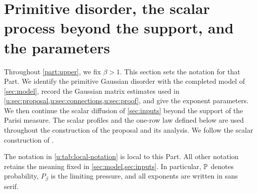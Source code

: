 \chapter{Primitive disorder, the scalar process beyond the support, and the parameters}\label{u:sec:setup}

Throughout \cref{part:upper}, we fix $\beta>1$. This section sets
the notation for that Part. We identify the
primitive Gaussian disorder with the completed model of \cref{sec:model},
record the Gaussian matrix estimates used in
\cref{u:sec:proposal,u:sec:connections,u:sec:proof}, and give the exponent
parameters. We then continue the scalar diffusion of \cref{sec:inputs}
beyond the support of the Parisi measure. The scalar profiles and the
one-row law defined below are used throughout the construction of the
proposal and its analysis. We follow the scalar construction of
\cite[Sections~2--3]{oai-typical-upper}.

The notation in \cref{u:tab:local-notation} is local to this Part.
All other notation retains the meaning fixed in \cref{sec:model,sec:inputs}.
In particular, $\mathbb P$ denotes probability, $P_\beta$ is the limiting
pressure, and all exponents are written in sans serif.

